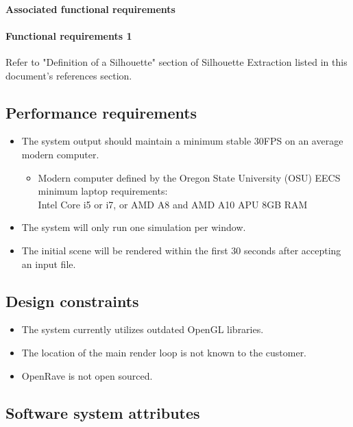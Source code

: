 \documentclass[10pt,journal,compsoc,draftclsnofoot]{IEEEtran}
\begin{document}
\begin{flushleft}
\paragraph{Associated functional requirements}

\paragraph{Functional requirements 1}
Refer to "Definition of a Silhouette" section of Silhouette Extraction listed in this document's references section.

\subsection{Performance requirements}
\vspace{3mm}
\begin{itemize}
\item The system output should maintain a minimum stable 30FPS on an average modern computer.
\begin{itemize}
\item Modern computer defined by the Oregon State University (OSU) EECS minimum laptop requirements: \\
Intel Core i5 or i7, or AMD A8 and AMD A10 APU
8GB RAM

\end{itemize}
\item The system will only run one simulation per window.
\item The initial scene will be rendered within the first 30 seconds after accepting an input file.
\end{itemize}

\subsection{Design constraints}
\vspace{3mm}
\begin{itemize}
\item The system currently utilizes outdated OpenGL libraries.
\item The location of the main render loop is not known to the customer.
\item OpenRave is not open sourced.
\end{itemize}


\subsection{Software system attributes}
\vspace{3mm}

\end{flushleft}
\end{document}
